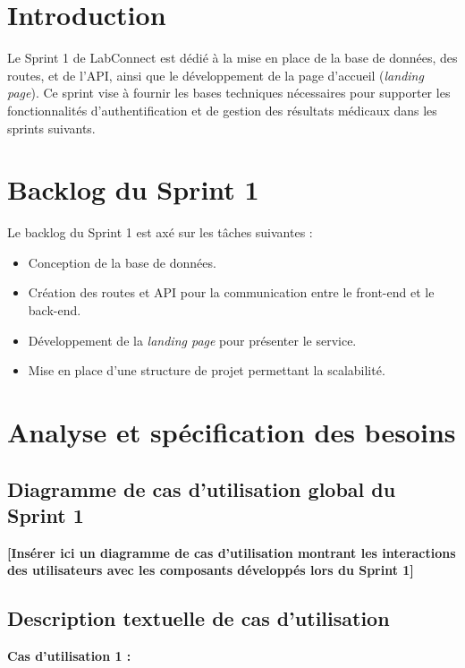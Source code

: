 \documentclass[12pt,a4paper]{report}
\begin{document}
\section{Introduction}

Le Sprint 1 de LabConnect est dédié à la mise en place de la base de données, des routes, et de l’API, ainsi que le développement de la page d'accueil (\textit{landing page}). Ce sprint vise à fournir les bases techniques nécessaires pour supporter les fonctionnalités d'authentification et de gestion des résultats médicaux dans les sprints suivants.

\section{Backlog du Sprint 1}

Le backlog du Sprint 1 est axé sur les tâches suivantes :

\begin{itemize}
    \item Conception de la base de données.
    \item Création des routes et API pour la communication entre le front-end et le back-end.
    \item Développement de la \textit{landing page} pour présenter le service.
    \item Mise en place d’une structure de projet permettant la scalabilité.
\end{itemize}

\section{Analyse et spécification des besoins}

\subsection{Diagramme de cas d’utilisation global du Sprint 1}

\textbf{[Insérer ici un diagramme de cas d’utilisation montrant les interactions des utilisateurs avec les composants développés lors du Sprint 1]}

\subsection{Description textuelle de cas d’utilisation}

\textbf{Cas d’utilisation 1 :}
\end{document}
